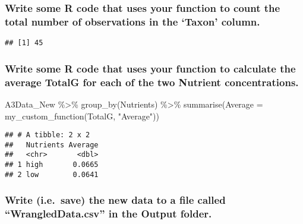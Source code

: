 \documentclass[
]{article}
\newenvironment{Shaded}{\begin{snugshade}}{\end{snugshade}}
\newcommand{\AttributeTok}[1]{\textcolor[rgb]{0.77,0.63,0.00}{#1}}
\newcommand{\FunctionTok}[1]{\textcolor[rgb]{0.00,0.00,0.00}{#1}}
\newcommand{\NormalTok}[1]{#1}
\newcommand{\SpecialCharTok}[1]{\textcolor[rgb]{0.00,0.00,0.00}{#1}}
\newcommand{\StringTok}[1]{\textcolor[rgb]{0.31,0.60,0.02}{#1}}
\begin{document}
\hypertarget{write-some-r-code-that-uses-your-function-to-count-the-total-number-of-observations-in-the-taxon-column.}{%
\subsubsection{Write some R code that uses your function to count the
total number of observations in the `Taxon'
column.}\label{write-some-r-code-that-uses-your-function-to-count-the-total-number-of-observations-in-the-taxon-column.}}

\begin{Shaded}
\end{Shaded}

\begin{verbatim}
## [1] 45
\end{verbatim}

\hypertarget{write-some-r-code-that-uses-your-function-to-calculate-the-average-totalg-for-each-of-the-two-nutrient-concentrations.}{%
\subsubsection{Write some R code that uses your function to calculate
the average TotalG for each of the two Nutrient
concentrations.}\label{write-some-r-code-that-uses-your-function-to-calculate-the-average-totalg-for-each-of-the-two-nutrient-concentrations.}}

\begin{Shaded}
\begin{Highlighting}[]
\NormalTok{A3Data\_New }\SpecialCharTok{\%\textgreater{}\%} 
  \FunctionTok{group\_by}\NormalTok{(Nutrients) }\SpecialCharTok{\%\textgreater{}\%} 
  \FunctionTok{summarise}\NormalTok{(}\AttributeTok{Average =} \FunctionTok{my\_custom\_function}\NormalTok{(TotalG, }\StringTok{"Average"}\NormalTok{))}
\end{Highlighting}
\end{Shaded}

\begin{verbatim}
## # A tibble: 2 x 2
##   Nutrients Average
##   <chr>       <dbl>
## 1 high       0.0665
## 2 low        0.0641
\end{verbatim}

\hypertarget{write-i.e.-save-the-new-data-to-a-file-called-wrangleddata.csv-in-the-output-folder.}{%
\subsubsection{Write (i.e.~save) the new data to a file called
``WrangledData.csv'' in the Output
folder.}\label{write-i.e.-save-the-new-data-to-a-file-called-wrangleddata.csv-in-the-output-folder.}}
\end{document}
